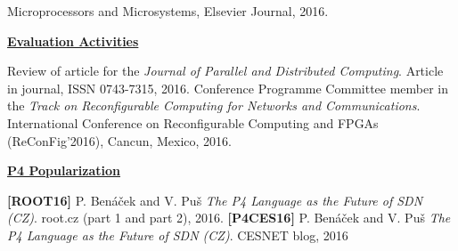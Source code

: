 \begin{frame}[allowframebreaks]
{\begin{itemize}
        Microprocessors and Microsystems, Elsevier Journal, 2016.
    \end{itemize}
    \textbf{\underline{Evaluation Activities}}
    \begin{itemize}
      \fitem[$\rightarrow$] Review of article for the \textit{Journal of Parallel and Distributed Computing}. Article in journal, ISSN 0743-7315, 2016.
      \fitem[$\rightarrow$] Conference Programme Committee member in the \textit{Track on Reconfigurable Computing for Networks and Communications}. International Conference on Reconfigurable Computing and FPGAs (ReConFig'2016), Cancun, Mexico, 2016.
    \end{itemize}
    \textbf{\underline{P4 Popularization}}
    \begin{itemize}
        \fitem[$\rightarrow$] \textbf{[ROOT16]} P. Ben{\'a}{\v{c}}ek and V. Pu{\v{s}} 
        \textit{The P4 Language as the Future of SDN (CZ)}. 
        root.cz (part 1 and part 2), 2016.
        \fitem[$\rightarrow$] \textbf{[P4CES16]} P. Ben{\'a}{\v{c}}ek and V. Pu{\v{s}} 
        \textit{The P4 Language as the Future of SDN (CZ)}. 
        CESNET blog, 2016 
       
     \end{itemize}
    } 
\end{frame}
